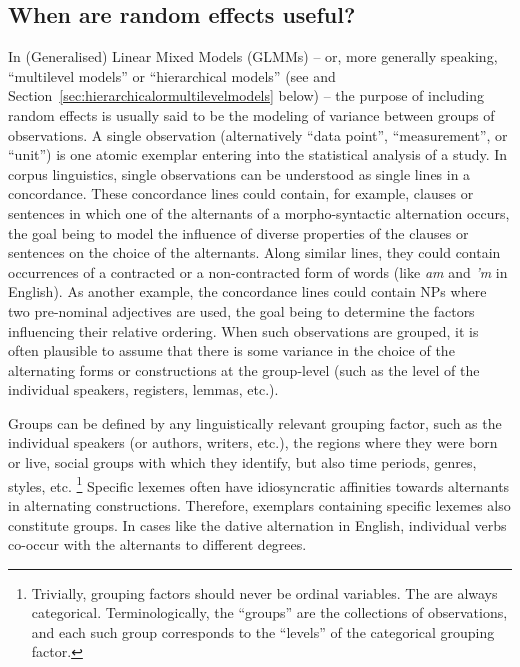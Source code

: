 \subsection{When are random effects useful?}
\label{sec:whenrandomeffectsareuseful}

In (Generalised) Linear Mixed Models (GLMMs) -- or, more generally speaking, ``multilevel models'' or ``hierarchical models'' (see \citealp{GelmanHill2006} and Section~\ref{sec:hierarchicalormultilevelmodels} below) -- the purpose of including random effects is usually said to be the modeling of variance between groups of observations.
A single observation (alternatively ``data point'', ``measurement'', or ``unit'') is one atomic exemplar entering into the statistical analysis of a study.
In corpus linguistics, single observations can be understood as single lines in a concordance.
These concordance lines could contain, for example, clauses or sentences in which one of the alternants of a morpho-syntactic alternation occurs, the goal being to model the influence of diverse properties of the clauses or sentences on the choice of the alternants.
Along similar lines, they could contain occurrences of a contracted or a non-contracted form of words (like \textit{am} and \textit{'m} in English).
As another example, the concordance lines could contain NPs where two pre-nominal adjectives are used, the goal being to determine the factors influencing their relative ordering.
When such observations are grouped, it is often plausible to assume that there is some variance in the choice of the alternating forms or constructions at the group-level (such as the level of the individual speakers, registers, lemmas, etc.).

Groups can be defined by any linguistically relevant grouping factor, such as the individual speakers (or authors, writers, etc.), the regions where they were born or live, social groups with which they identify, but also time periods, genres, styles, etc.%
\footnote{Trivially, grouping factors should never be ordinal variables.
The are always categorical.
Terminologically, the ``groups'' are the collections of observations, and each such group corresponds to the ``levels'' of the categorical grouping factor.}
Specific lexemes often have idiosyncratic affinities towards alternants in alternating constructions.
Therefore, exemplars containing specific lexemes also constitute groups.
In cases like the dative alternation in English, individual verbs co-occur with the alternants to different degrees.

